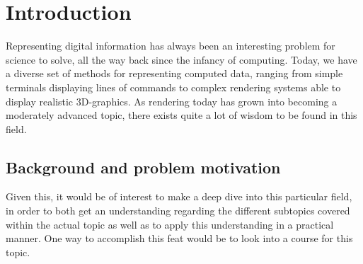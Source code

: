 \section{Introduction}
\label{ch:intro}
\noindent

Representing digital information has always been an interesting problem for science to solve, all the way back since the infancy of computing. Today, we have a diverse set of methods for representing computed data, ranging from simple terminals displaying lines of commands to complex rendering systems able to display realistic 3D-graphics. As rendering today has grown into becoming a moderately advanced topic, there exists quite a lot of wisdom to be found in this field.

\iffalse
During your previous education, you have probably come across relatively well defined problem types as formulated by teachers, textbooks and teaching aids. During project courses and exam work you are required to do a great deal of the thinking by yourself in order to define and clarify the direction of the assignment. This analysis should be presented in the report's introductory chapter. By describing the problem or problem area chosen for study and the reasons behind this choice, it should then be possible to write a general introduction to the report.
The introductory chapter relates to the content in the project plan that will be presented some weeks after the diploma work has started. The project plan should also contain a time plan for the work. The project plan can also mention some of the intended sources to be read and subsequently referred to in chapter 2, and also to contain some thoughts about the method (see chapter 3) chosen in order to approach the problem.
The introduction making up chapter 1, may also contain sub-headings underneath. Try to get to the point as soon as possible. In order to retain the reader's interest information concerning your work must be given within the first few sentences. People only requiring a quick insight into the work will often only read the report's summary, introduction and conclusions, since these sections are usually written without the inclusion of highly technical and mathematical details.
\fi

\subsection{Background and problem motivation}
\label{ch:intro:problem-motivation}

Given this, it would be of interest to make a deep dive into this particular field, in order to both get an understanding regarding the different subtopics covered within the actual topic as well as to apply this understanding in a practical manner. One way to accomplish this feat would be to look into a course for this topic.

